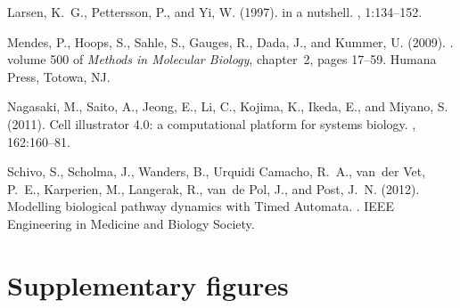 \documentclass{bmcart}
\begin{document}
\begin{thebibliography}{}
Larsen, K.~G., Pettersson, P., and Yi, W. (1997).
 in a nutshell.
, 1:134--152.

Mendes, P., Hoops, S., Sahle, S., Gauges, R., Dada, J., and Kummer, U. (2009).
.
\newblock volume 500 of {\em Methods in Molecular Biology}, chapter~2, pages
  17--59. Humana Press, Totowa, NJ.

Nagasaki, M., Saito, A., Jeong, E., Li, C., Kojima, K., Ikeda, E., and Miyano,
  S. (2011).
\newblock Cell illustrator 4.0: a computational platform for systems biology.
, 162:160--81.

Schivo, S., Scholma, J., Wanders, B., {Urquidi Camacho}, R.~A., van~der Vet,
  P.~E., Karperien, M., Langerak, R., van~de Pol, J., and Post, J.~N. (2012).
\newblock Modelling biological pathway dynamics with {Timed Automata}.
. IEEE Engineering
  in Medicine and Biology Society.

\end{thebibliography}





\clearpage

\section*{Supplementary figures}\label{sec:supplementary-figures}
\end{document}
